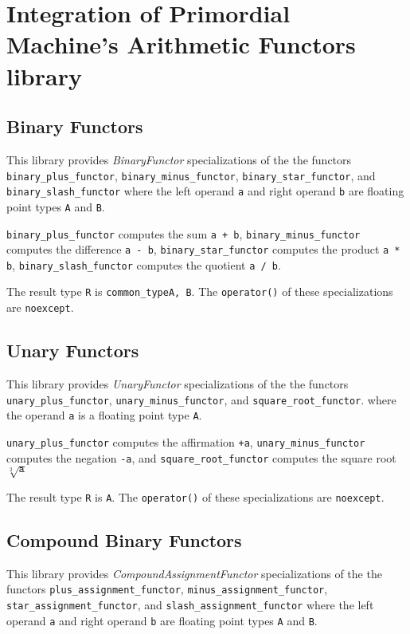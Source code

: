 \section{Integration of Primordial Machine's Arithmetic Functors   library}

\subsection{Binary Functors}
\noindent{}This library provides \textit{BinaryFunctor}    specializations of the
the functors
\texttt{binary\_plus\_functor},
\texttt{binary\_minus\_functor},
\texttt{binary\_star\_functor}, and
\texttt{binary\_slash\_functor}
where the left operand \texttt{a} and right operand \texttt{b} are floating point
types \texttt{A} and \texttt{B}.\newline

\texttt{binary\_plus\_functor} computes the sum \texttt{a + b},
\texttt{binary\_minus\_functor} computes the difference \texttt{a - b},
\texttt{binary\_star\_functor} computes the product \texttt{a * b},
\texttt{binary\_slash\_functor} computes the quotient \texttt{a / b}.\newline

The result type \texttt{R} is \texttt{common\_type\textlangle A, B\textrangle}.
The \texttt{operator()} of these specializations are \texttt{noexcept}.

\subsection{Unary Functors}
\noindent{}This library provides \textit{UnaryFunctor}    specializations of the
the functors
\texttt{unary\_plus\_functor},
\texttt{unary\_minus\_functor}, and
\texttt{square\_root\_functor}.
where the operand \texttt{a} is a floating point type \texttt{A}.\newline

\texttt{unary\_plus\_functor} computes the affirmation \texttt{+a},
\texttt{unary\_minus\_functor} computes the negation \texttt{-a}, and
\texttt{square\_root\_functor} computes the square root $\sqrt[2]{\texttt{a}}$\newline

The result type \texttt{R} is \texttt{A}.
The \texttt{operator()} of these specializations are \texttt{noexcept}.

\subsection{Compound Binary Functors}
\noindent{}This library provides \textit{CompoundAssignmentFunctor}    specializations of the
the functors
\texttt{plus\_assignment\_functor},
\texttt{minus\_assignment\_functor},
\texttt{star\_assignment\_functor}, and
\texttt{slash\_assignment\_functor}
where the left operand \texttt{a} and right operand \texttt{b} are floating point
types \texttt{A} and \texttt{B}.\newline

